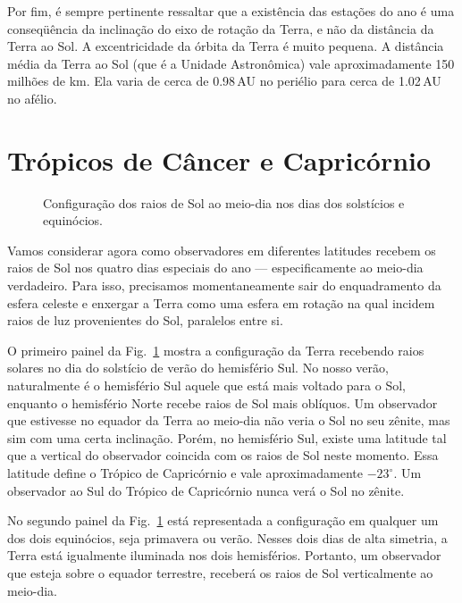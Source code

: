 Por fim, é sempre pertinente ressaltar que a existência das estações do ano é uma conseqüência da inclinação do eixo de rotação da Terra, e não da distância da Terra ao Sol. A excentricidade da órbita da Terra é muito pequena. A distância média da Terra ao Sol (que é a Unidade Astronômica) vale aproximadamente 150 milhões de km. Ela varia de cerca de 0.98\,AU no periélio para cerca de 1.02\,AU no afélio.

\section{Trópicos de Câncer e Capricórnio}

\begin{figure}
\centering



\caption{Configuração dos raios de Sol ao meio-dia nos dias dos solstícios e equinócios.}
\label{fig:marcosetembro}
\end{figure}

Vamos considerar agora como observadores em diferentes latitudes recebem os raios de Sol nos quatro dias especiais do ano --- especificamente ao meio-dia verdadeiro. Para isso, precisamos momentaneamente sair do enquadramento da esfera celeste e enxergar a Terra como uma esfera em rotação na qual incidem raios de luz provenientes do Sol, paralelos entre si.

O primeiro painel da Fig.~\ref{fig:marcosetembro} mostra a configuração da Terra recebendo raios solares no dia do solstício de verão do hemisfério Sul. No nosso verão, naturalmente é o hemisfério Sul aquele que está mais voltado para o Sol, enquanto o hemisfério Norte recebe raios de Sol mais oblíquos. Um observador que estivesse no equador da Terra ao meio-dia não veria o Sol no seu zênite, mas sim com uma certa inclinação. Porém, no hemisfério Sul, existe uma latitude tal que a vertical do observador coincida com os raios de Sol neste momento. Essa latitude define o Trópico de Capricórnio e vale aproximadamente $-23^{\circ}$. Um observador ao Sul do Trópico de Capricórnio nunca verá o Sol no zênite.

No segundo painel da Fig.~\ref{fig:marcosetembro} está representada a configuração em qualquer um dos dois equinócios, seja primavera ou verão. Nesses dois dias de alta simetria, a Terra está igualmente iluminada nos dois hemisférios. Portanto, um observador que esteja sobre o equador terrestre, receberá os raios de Sol verticalmente ao meio-dia.

